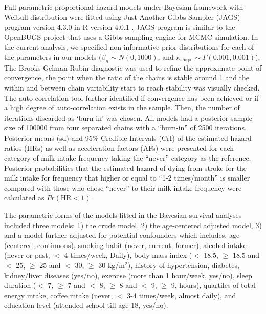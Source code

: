 \documentclass[nutrients,article,submitted,moreauthors,pdftex]{Definitions/mdpi}
\providecommand{\DIFadd}[1]{{\protect\color{blue}\uwave{#1}}} %
\providecommand{\DIFdel}[1]{{\protect\color{red}\sout{#1}}}                      %
\providecommand{\DIFaddbegin}{} %
\providecommand{\DIFaddend}{} %
\providecommand{\DIFdelbegin}{} %
\providecommand{\DIFdelend}{} %
\newcommand{\DIFscaledelfig}{0.5}
\newlength{\DIFdelgraphicswidth} %
\newlength{\DIFdelgraphicsheight} %
\newcommand{\DIFaddincludegraphics}[2][]{{\color{blue}\fbox{\DIFOincludegraphics[#1]{#2}}}} %
\newcommand{\DIFdelincludegraphics}[2][]{%
\sbox{\DIFdelgraphicsbox}{\DIFOincludegraphics[#1]{#2}}%
\settoboxwidth{\DIFdelgraphicswidth}{\DIFdelgraphicsbox} %
\settoboxtotalheight{\DIFdelgraphicsheight}{\DIFdelgraphicsbox} %
\scalebox{\DIFscaledelfig}{%
\parbox[b]{\DIFdelgraphicswidth}{\usebox{\DIFdelgraphicsbox}\\[-\baselineskip] \rule{\DIFdelgraphicswidth}{0em}}\llap{\resizebox{\DIFdelgraphicswidth}{\DIFdelgraphicsheight}{%
\setlength{\unitlength}{\DIFdelgraphicswidth}%
\begin{picture}(1,1)%
\thicklines\linethickness{2pt} %
{\color[rgb]{1,0,0}\put(0,0){\framebox(1,1){}}}%
{\color[rgb]{1,0,0}\put(0,0){\line( 1,1){1}}}%
{\color[rgb]{1,0,0}\put(0,1){\line(1,-1){1}}}%
\end{picture}%
}\hspace*{3pt}}} %
} %
\DeclareRobustCommand{\DIFaddbegin}{\DIFOaddbegin \let\includegraphics\DIFaddincludegraphics} %
\DeclareRobustCommand{\DIFaddend}{\DIFOaddend \let\includegraphics\DIFOincludegraphics} %
\DeclareRobustCommand{\DIFdelbegin}{\DIFOdelbegin \let\includegraphics\DIFdelincludegraphics} %
\DeclareRobustCommand{\DIFdelend}{\DIFOaddend \let\includegraphics\DIFOincludegraphics} %
\begin{document}
Full parametric proportional hazard models under Bayesian framework with
Weibull distribution were fitted using Just Another Gibbs Sampler (JAGS)
program \citep{Plummer2003} version 4.3.0 in R version 4.0.1
\citep{RCT2020}. JAGS program is similar to the OpenBUGS
\citep{Lunn2009} project that uses a Gibbs sampling engine for MCMC
simulation. In the current analysis, we specified non-informative prior
distributions for each of the parameters in our models
(\(\beta_n \sim N(0, 1000)\), and
\(\kappa_{\text{shape}} \sim \Gamma(0.001, 0.001)\)). The
Brooks-Gelman-Rubin diagnostic \citep{Brooks1998} was used to refine the
approximate point of convergence, the point when the ratio of the chains
is stable around 1 and the within and between chain variability start to
reach stability was visually checked. The auto-correlation tool further
identified if convergence has been achieved or if a high degree of
auto-correlation exists in the sample. Then, the number of iterations
discarded as `burn-in' was chosen. All models had a posterior sample
size of 100000 from four separated chains with a ``burn-in'' of 2500
iterations. Posterior means (\DIFdelbegin \DIFdel{sd}\DIFdelend \DIFaddbegin \DIFadd{SD}\DIFaddend ) and 95\% Credible Intervals (CrI) of
the estimated hazard ratios (HRs) as well as acceleration factors (AFs)
were presented for each category of milk intake frequency taking the
``never'' category as the reference. Posterior probabilities that the
estimated hazard of dying from stroke for the milk intake for frequency
that higher or equal to ``1-2 times/month'' is smaller compared with
those who chose ``never'' to their milk intake frequency were calculated
as \(Pr(\text{HR} < 1)\).

The parametric forms of the models fitted in the Bayesian survival
analyses included three models: 1) the crude model, 2) the age-centered
adjusted model, 3) and a model further adjusted for potential
confounders which includes: age (centered, continuous), smoking habit
(never, current, former), alcohol intake (never or past, \(<\) 4
times/week, Daily), body mass index (\(<\) 18.5, \(\geq\) 18.5 and \(<\)
25, \(\geq\) 25 and \(<\) 30, \(\geq\) 30 kg/m\(^2\)), history of
hypertension, diabetes, kidney/liver diseases (yes/no), exercise (more
than 1 hour/week, yes/no), sleep duration (\(<\) 7, \(\geq\) 7 and \(<\)
8, \(\geq\) 8 and \(<\) 9, \(\geq\) 9, hours), quartiles of total energy
intake, coffee intake (never, \(<\) 3-4 times/week, almost daily), and
education level (attended school till age 18, yes/no).
\end{document}
